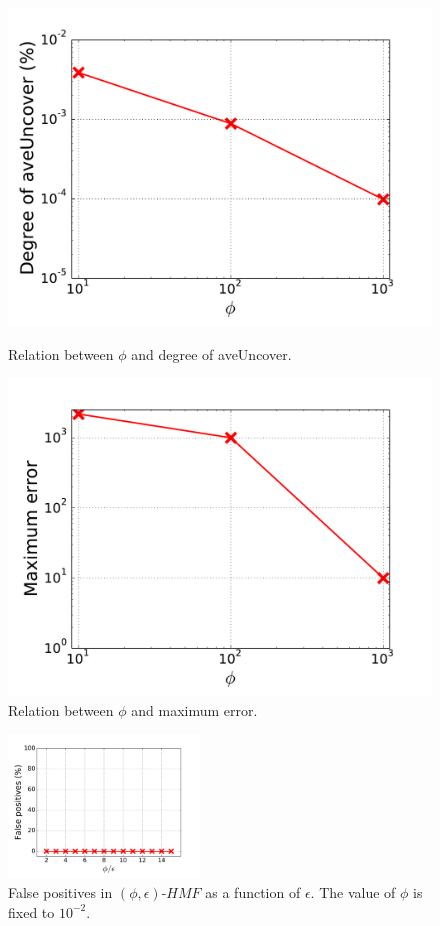 \begin{figure}[!htb]
  \includegraphics[width=\linewidth]{figure/aveUncover.pdf}
  \caption{Relation between $\phi$ and degree of aveUncover.}
  \label{fig:aveUncover}
\endminipage\hfill
{}%
  \includegraphics[width=\linewidth]{figure/maxError.pdf}
  \caption{Relation between $\phi$ and maximum error.}
  \label{fig:maxError}

\endminipage
\end{figure}

\begin{figure}[t!]
\begin{center}
\includegraphics[width=2.0in]{figure/fp}
\caption{False positives in $(\phi, \epsilon)\mbox{-}HMF$ as a function of $\epsilon$. The value of $\phi$ is fixed to $10^{-2}$.}
\label{fig:fp}
\end{center}
\end{figure}

